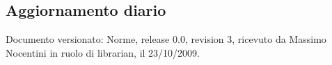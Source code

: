 \subsection{Aggiornamento diario}
Documento versionato: Norme, release 0.0, revision 3, ricevuto da Massimo Nocentini in ruolo di librarian, il 23/10/2009. 
